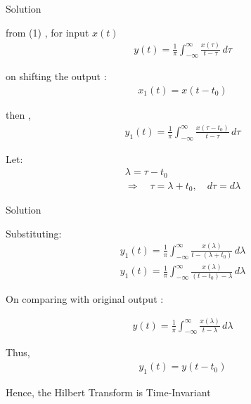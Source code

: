 \documentclass{beamer}
\begin{document}
\begin{frame}{Solution}

from (1) , for input $x(t)$
\begin{align}
y(t) = \frac{1}{\pi} \int_{-\infty}^{\infty} \frac{x(\tau)}{t - \tau}\, d\tau
\end{align}

on shifting the output :
\begin{align}
x_1(t) = x(t - t_0)
\end{align}

then , 
\begin{align}
y_1(t) = \frac{1}{\pi} \int_{-\infty}^{\infty} \frac{x(\tau - t_0)}{t - \tau}\, d\tau
\end{align}


Let:
\begin{align*}
\lambda = \tau - t_0 \\
\Rightarrow \quad \tau = \lambda + t_0 , \quad d\tau = d\lambda
\end{align*}




\end{frame}

\begin{frame}{Solution}


Substituting:
\begin{align}
y_1(t) = \frac{1}{\pi} \int_{-\infty}^{\infty} \frac{x(\lambda)}{t - (\lambda + t_0)}\, d\lambda \\
y_1(t) = \frac{1}{\pi} \int_{-\infty}^{\infty} \frac{x(\lambda)}{(t - t_0) - \lambda}\, d\lambda
\end{align}

On comparing with original output :

\begin{align}
y(t) = \frac{1}{\pi} \int_{-\infty}^{\infty} \frac{x(\lambda)}{t - \lambda}\, d\lambda
\end{align}

Thus,
\begin{align}
y_1(t) = y(t - t_0)
\end{align}

Hence, the Hilbert Transform is Time-Invariant
\end{frame}
\end{document}
